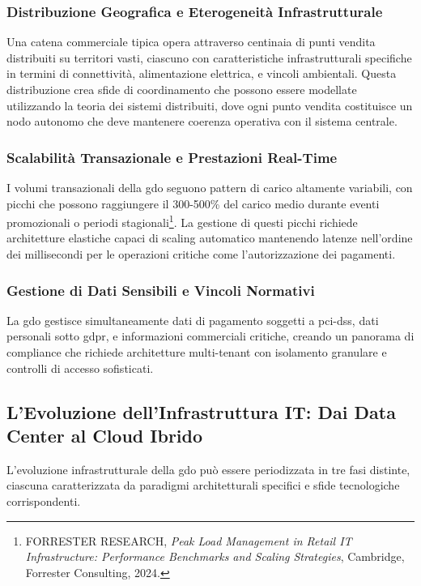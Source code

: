 \subsubsection{Distribuzione Geografica e Eterogeneità Infrastrutturale}

Una catena commerciale tipica opera attraverso centinaia di punti vendita distribuiti su territori vasti, ciascuno con caratteristiche infrastrutturali specifiche in termini di connettività, alimentazione elettrica, e vincoli ambientali. Questa distribuzione crea sfide di coordinamento che possono essere modellate utilizzando la teoria dei sistemi distribuiti, dove ogni punto vendita costituisce un nodo autonomo che deve mantenere coerenza operativa con il sistema centrale.

\subsubsection{Scalabilità Transazionale e Prestazioni Real-Time}

I volumi transazionali della \gls{gdo} seguono pattern di carico altamente variabili, con picchi che possono raggiungere il 300-500\% del carico medio durante eventi promozionali o periodi stagionali\footnote{FORRESTER RESEARCH, \textit{Peak Load Management in Retail IT Infrastructure: Performance Benchmarks and Scaling Strategies}, Cambridge, Forrester Consulting, 2024.}. La gestione di questi picchi richiede architetture elastiche capaci di scaling automatico mantenendo latenze nell'ordine dei millisecondi per le operazioni critiche come l'autorizzazione dei pagamenti.

\subsubsection{Gestione di Dati Sensibili e Vincoli Normativi}

La \gls{gdo} gestisce simultaneamente dati di pagamento soggetti a \gls{pci-dss}, dati personali sotto \gls{gdpr}, e informazioni commerciali critiche, creando un panorama di compliance che richiede architetture multi-tenant con isolamento granulare e controlli di accesso sofisticati.

\subsection{L'Evoluzione dell'Infrastruttura IT: Dai Data Center al Cloud Ibrido}
\label{subsec:evoluzione-infrastruttura}

L'evoluzione infrastrutturale della \gls{gdo} può essere periodizzata in tre fasi distinte, ciascuna caratterizzata da paradigmi architetturali specifici e sfide tecnologiche corrispondenti.

